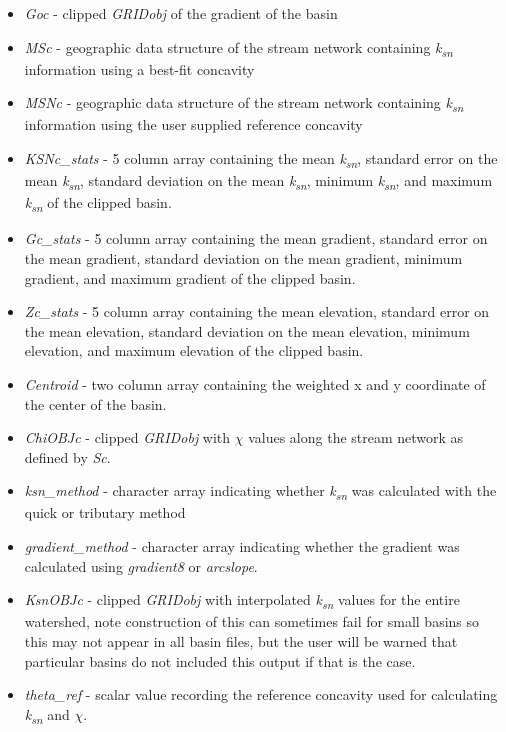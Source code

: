 \begin{enumerate}
\begin{itemize}
		\item \textit{Goc} - clipped \textit{GRIDobj} of the gradient of the basin
		\item \textit{MSc} - geographic data structure of the stream network containing \textit{k\textsubscript{sn}} information using a best-fit concavity
		\item \textit{MSNc} - geographic data structure of the stream network containing \textit{k\textsubscript{sn}} information using the user supplied reference concavity
		\item \textit{KSNc\_stats} - 5 column array containing the mean \textit{k\textsubscript{sn}}, standard error on the mean \textit{k\textsubscript{sn}}, standard deviation on the  mean \textit{k\textsubscript{sn}}, minimum \textit{k\textsubscript{sn}}, and maximum \textit{k\textsubscript{sn}} of the clipped basin.
		\item \textit{Gc\_stats} - 5 column array containing the mean gradient, standard error on the mean gradient, standard deviation on the mean gradient, minimum gradient, and maximum gradient of the clipped basin.
		\item \textit{Zc\_stats} - 5 column array containing the mean elevation, standard error on the mean elevation, standard deviation on the mean elevation, minimum elevation, and maximum elevation of the clipped basin.
		\item \textit{Centroid} - two column array containing the weighted x and y coordinate of the center of the basin.
		\item \textit{ChiOBJc} - clipped \textit{GRIDobj} with $\chi$ values along the stream network as defined by \textit{Sc}.
		\item \textit{ksn\_method} - character array indicating whether \textit{k\textsubscript{sn}} was calculated with the quick or tributary method
		\item \textit{gradient\_method} - character array indicating whether the gradient was calculated using \textit{gradient8} or \textit{arcslope}.
		\item \textit{KsnOBJc} - clipped \textit{GRIDobj} with interpolated \textit{k\textsubscript{sn}} values for the entire watershed, note construction of this can sometimes fail for small basins so this may not appear in all basin files, but the user will be warned that particular basins do not included this output if that is the case.
		\item \textit{theta\_ref} - scalar value recording the reference concavity used for calculating \textit{k\textsubscript{sn}} and $\chi$.

\end{itemize}
\end{enumerate}

